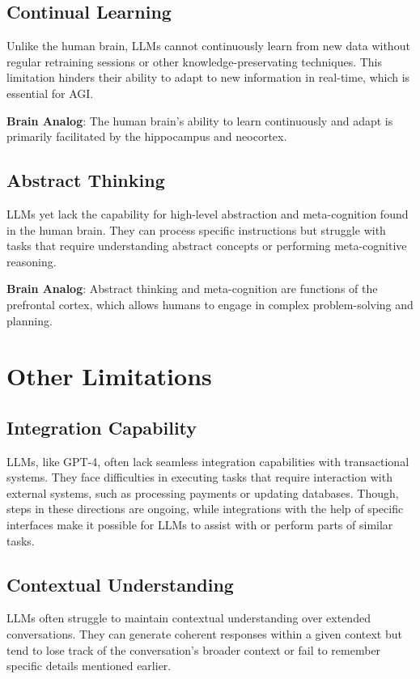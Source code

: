 \documentclass[a4paper,10.5pt]{article}
\begin{document}
\subsection{Continual Learning}
Unlike the human brain, LLMs cannot continuously learn from new data without regular retraining sessions or other knowledge-preservating techniques. This limitation hinders their ability to adapt to new information in real-time, which is essential for AGI.

\textbf{Brain Analog}: The human brain's ability to learn continuously and adapt is primarily facilitated by the hippocampus and neocortex.

\subsection{Abstract Thinking}
LLMs yet lack the capability for high-level abstraction and meta-cognition found in the human brain. They can process specific instructions but struggle with tasks that require understanding abstract concepts or performing meta-cognitive reasoning.

\textbf{Brain Analog}: Abstract thinking and meta-cognition are functions of the prefrontal cortex, which allows humans to engage in complex problem-solving and planning.

\section{Other Limitations}

\subsection{Integration Capability}
LLMs, like GPT-4, often lack seamless integration capabilities with transactional systems. They face difficulties in executing tasks that require interaction with external systems, such as processing payments or updating databases. Though, steps in these directions are ongoing, while integrations with the help of specific interfaces make it possible for LLMs to assist with or perform parts of similar tasks.

\subsection{Contextual Understanding}
LLMs often struggle to maintain contextual understanding over extended conversations. They can generate coherent responses within a given context but tend to lose track of the conversation's broader context or fail to remember specific details mentioned earlier.
\end{document}
